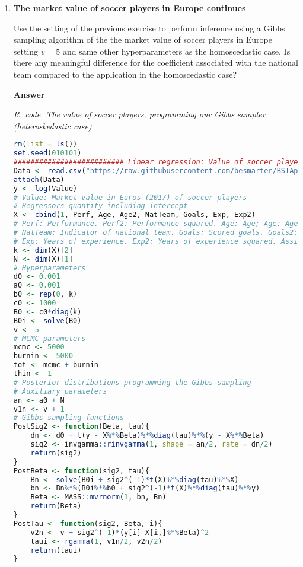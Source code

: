 \begin{enumerate}[leftmargin=*]
Following same steps as in the previous exercise we get $\bm{\beta}|\sigma^2,\bm{\tau},{\bm{y}},{\bm{X}}\sim N(\bm{\beta}_n,{\bm{B}}_n)$.

\item \textbf{The market value of soccer players in Europe continues}

Use the setting of the previous exercise to perform inference using a Gibbs sampling algorithm of the the market value of soccer players in Europe setting $v=5$ and same other hyperparameters as the homoscedastic case. Is there any meaningful difference for the coefficient associated with the national team compared to the application in the homoscedastic case?

\textbf{Answer}


\begin{tcolorbox}[enhanced,width=4.67in,center upper,
	fontupper=\large\bfseries,drop shadow southwest,sharp corners]
	\textit{R. code. The value of soccer players, programming our Gibbs sampler (heteroskedastic case)}
	\begin{VF}
		\begin{lstlisting}[language=R]		
rm(list = ls())
set.seed(010101)
########################## Linear regression: Value of soccer players ##########################
Data <- read.csv("https://raw.githubusercontent.com/besmarter/BSTApp/refs/heads/master/DataApp/1ValueFootballPlayers.csv", sep = ",", header = TRUE, quote = "")
attach(Data)
y <- log(Value) 
# Value: Market value in Euros (2017) of soccer players
# Regressors quantity including intercept
X <- cbind(1, Perf, Age, Age2, NatTeam, Goals, Exp, Exp2)
# Perf: Performance. Perf2: Performance squared. Age: Age; Age: Age squared. 
# NatTeam: Indicator of national team. Goals: Scored goals. Goals2: Scored goals squared
# Exp: Years of experience. Exp2: Years of experience squared. Assists: Number of assists
k <- dim(X)[2]
N <- dim(X)[1]
# Hyperparameters
d0 <- 0.001
a0 <- 0.001
b0 <- rep(0, k)
c0 <- 1000
B0 <- c0*diag(k)
B0i <- solve(B0)
v <- 5
# MCMC parameters
mcmc <- 5000
burnin <- 5000
tot <- mcmc + burnin
thin <- 1
# Posterior distributions programming the Gibbs sampling
# Auxiliary parameters
an <- a0 + N
v1n <- v + 1
# Gibbs sampling functions
PostSig2 <- function(Beta, tau){
	dn <- d0 + t(y - X%*%Beta)%*%diag(tau)%*%(y - X%*%Beta)
	sig2 <- invgamma::rinvgamma(1, shape = an/2, rate = dn/2)
	return(sig2)
}
PostBeta <- function(sig2, tau){
	Bn <- solve(B0i + sig2^(-1)*t(X)%*%diag(tau)%*%X)
	bn <- Bn%*%(B0i%*%b0 + sig2^(-1)*t(X)%*%diag(tau)%*%y)
	Beta <- MASS::mvrnorm(1, bn, Bn)
	return(Beta)
}
PostTau <- function(sig2, Beta, i){
	v2n <- v + sig2^(-1)*(y[i]-X[i,]%*%Beta)^2
	taui <- rgamma(1, v1n/2, v2n/2)
	return(taui)
}			
\end{lstlisting}
	\end{VF}
\end{tcolorbox} 


\end{enumerate}
